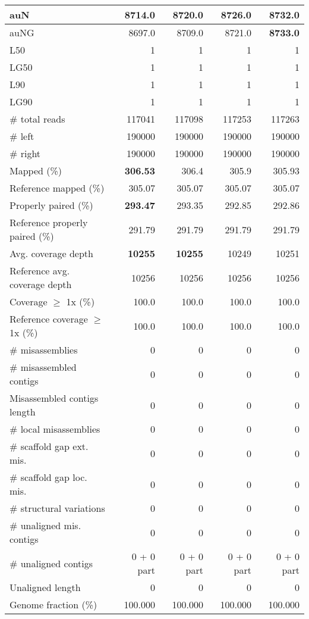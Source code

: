 \documentclass[12pt,a4paper]{article}
\begin{document}
\begin{table}[ht]
\begin{center}
\begin{tabular}{|l*{4}{|r}|}
auN & 8714.0 & 8720.0 & 8726.0 & {\bf 8732.0} \\ \hline
auNG & 8697.0 & 8709.0 & 8721.0 & {\bf 8733.0} \\ \hline
L50 & 1 & 1 & 1 & 1 \\ \hline
LG50 & 1 & 1 & 1 & 1 \\ \hline
L90 & 1 & 1 & 1 & 1 \\ \hline
LG90 & 1 & 1 & 1 & 1 \\ \hline
\# total reads & 117041 & 117098 & 117253 & 117263 \\ \hline
\# left & 190000 & 190000 & 190000 & 190000 \\ \hline
\# right & 190000 & 190000 & 190000 & 190000 \\ \hline
Mapped (\%) & {\bf 306.53} & 306.4 & 305.9 & 305.93 \\ \hline
Reference mapped (\%) & 305.07 & 305.07 & 305.07 & 305.07 \\ \hline
Properly paired (\%) & {\bf 293.47} & 293.35 & 292.85 & 292.86 \\ \hline
Reference properly paired (\%) & 291.79 & 291.79 & 291.79 & 291.79 \\ \hline
Avg. coverage depth & {\bf 10255} & {\bf 10255} & 10249 & 10251 \\ \hline
Reference avg. coverage depth & 10256 & 10256 & 10256 & 10256 \\ \hline
Coverage $\geq$ 1x (\%) & 100.0 & 100.0 & 100.0 & 100.0 \\ \hline
Reference coverage $\geq$ 1x (\%) & 100.0 & 100.0 & 100.0 & 100.0 \\ \hline
\# misassemblies & 0 & 0 & 0 & 0 \\ \hline
\# misassembled contigs & 0 & 0 & 0 & 0 \\ \hline
Misassembled contigs length & 0 & 0 & 0 & 0 \\ \hline
\# local misassemblies & 0 & 0 & 0 & 0 \\ \hline
\# scaffold gap ext. mis. & 0 & 0 & 0 & 0 \\ \hline
\# scaffold gap loc. mis. & 0 & 0 & 0 & 0 \\ \hline
\# structural variations & 0 & 0 & 0 & 0 \\ \hline
\# unaligned mis. contigs & 0 & 0 & 0 & 0 \\ \hline
\# unaligned contigs & 0 + 0 part & 0 + 0 part & 0 + 0 part & 0 + 0 part \\ \hline
Unaligned length & 0 & 0 & 0 & 0 \\ \hline
Genome fraction (\%) & 100.000 & 100.000 & 100.000 & 100.000 \\ \hline

\end{tabular}
\end{center}
\end{table}
\end{document}
